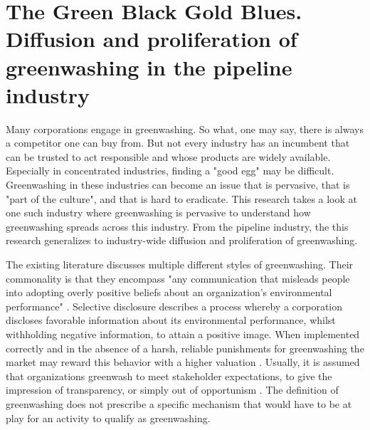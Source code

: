 \section{The Green Black Gold Blues. Diffusion and proliferation of greenwashing in the pipeline industry}

Many corporations engage in greenwashing. So what, one may say, there is always a competitor one can buy from. But not every industry has an incumbent that can be trusted to act responsible and whose products are widely available. Especially in concentrated industries, finding a "good egg" may be difficult. Greenwashing in these industries can become an issue that is pervasive, that is "part of the culture", and that is hard to eradicate. This research takes a look at one such industry where greenwashing is pervasive to understand how greenwashing spreads across this industry. From the pipeline industry, the this research generalizes to industry-wide diffusion and proliferation of greenwashing.

The existing literature discusses multiple different styles of greenwashing. Their commonality is that they encompass "any communication that misleads people into adopting overly positive beliefs about an organization's environmental performance" \citep[p. 225]{Lyon2015}. Selective disclosure describes a process whereby a corporation discloses favorable information about its environmental performance, whilst withholding negative information, to attain a positive image. When implemented correctly and in the absence of a harsh, reliable punishments for greenwashing the market may reward this behavior with a higher valuation \citep{Lyon2011}. Usually, it is assumed that organizations greenwash to meet stakeholder expectations, to give the impression of transparency, or simply out of opportunism \citep{Kim2015, Marquis2016}. The definition of greenwashing does not prescribe a specific mechanism that would have to be at play for an activity to qualify as greenwashing.


